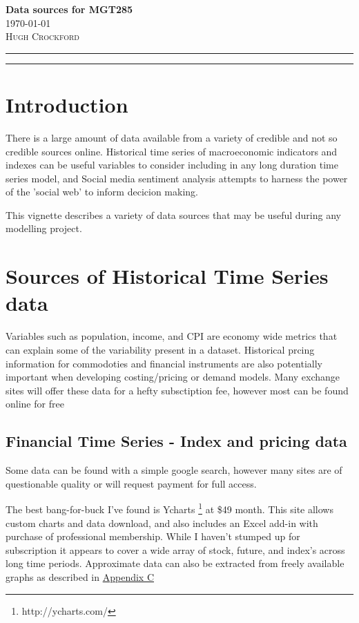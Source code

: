 \documentclass[11pt]{article}
\begin{document}
\begin{flushleft}
	\vspace*{0.3in}
	\Huge \textbf{Data sources for MGT285}\\
	\Large \today \\
	\vspace{0.25in}
	\textsc{Hugh Crockford}
	\vspace{0.25in}
	\hrule
	\hrule
	\tableofcontents
\end{flushleft}

	\vspace{0.75in}

\newpage
\section{Introduction}
	There is a large amount of data available from a variety of credible and not so credible sources online.
	Historical time series of macroeconomic indicators and indexes can be useful variables to consider including in any long duration time series model, and Social media sentiment analysis attempts to harness the power of the 'social web' to inform decicion making.


	This vignette describes a variety of data sources that may be useful during any modelling project.

\section{Sources of Historical Time Series data}
	Variables such as population, income, and CPI are economy wide metrics that can explain some of the variability present in a dataset.
	Historical prcing information for commodoties and financial instruments are also potentially important when developing costing/pricing or demand models.
	Many exchange sites will offer these data for a hefty subsctiption fee, however most can be found online for free

	\subsection{Financial Time Series - Index and pricing data}
	Some data can be found with a simple google search, however many sites are of questionable quality or will request payment for full access.


	The best bang-for-buck I've found is Ycharts \footnote{http://ycharts.com/} at \$49 month. 
	This site allows custom charts and data download, and also includes an Excel add-in with purchase of professional membership.
	While I haven't stumped up for subscription it appears to cover a wide array of stock, future, and index's across long time periods.
	Approximate data can also be extracted from freely available graphs as described in \hyperref[graph]{Appendix C}
\end{document}
